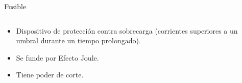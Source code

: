 \documentclass[xcolor={usenames,svgnames,dvipsnames}]{beamer}
\begin{document}
\begin{frame}[label={sec:org5fe1b35}]{Fusible}
\begin{columns}
\begin{column}{0.7\columnwidth}
\begin{itemize}
\item Dispositivo de protección contra sobrecarga (corrientes superiores a un umbral durante un tiempo prolongado).

\item Se funde por Efecto Joule.

\item Tiene poder de corte.
\end{itemize}
\end{column}
\begin{column}{0.3\columnwidth}
\begin{center}

\end{center}
\end{column}
\end{columns}
\end{frame}
\end{document}
